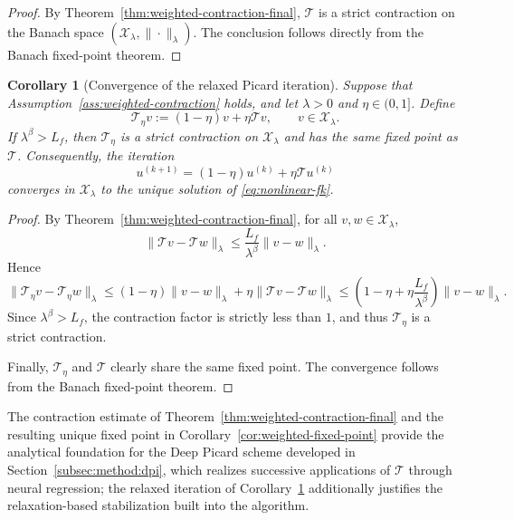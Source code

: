\documentclass[a4paper,fleqn]{cas-sc}
\newtheorem{corollary}{Corollary}
\begin{document}
\begin{proof}
By Theorem~\ref{thm:weighted-contraction-final}, $\mathcal{T}$ is a strict contraction on the Banach space $(\mathcal{X}_\lambda,\|\cdot\|_\lambda)$. The conclusion follows directly from the Banach fixed-point theorem.
\end{proof}

\begin{corollary}[Convergence of the relaxed Picard iteration]
\label{cor:relaxed-picard}
Suppose that Assumption~\ref{ass:weighted-contraction} holds, and let $\lambda>0$ and $\eta\in(0,1]$. Define
\begin{equation}\label{eq:relaxed-operator}
\mathcal{T}_\eta v := (1-\eta)v+\eta\mathcal{T}v,
\qquad v\in\mathcal{X}_\lambda.
\end{equation}
If $\lambda^\beta>L_f$, then $\mathcal{T}_\eta$ is a strict contraction on $\mathcal{X}_\lambda$ and has the same fixed point as $\mathcal{T}$. Consequently, the iteration
\begin{equation}\label{eq:relaxed-picard}
u^{(k+1)}=(1-\eta)u^{(k)}+\eta\mathcal{T}u^{(k)}
\end{equation}
converges in $\mathcal{X}_\lambda$ to the unique solution of \eqref{eq:nonlinear-fk}.
\end{corollary}

\begin{proof}
By Theorem~\ref{thm:weighted-contraction-final}, for all $v,w\in\mathcal{X}_\lambda$,
\[
\|\mathcal{T}v-\mathcal{T}w\|_\lambda
\le
\frac{L_f}{\lambda^\beta}\|v-w\|_\lambda.
\]
Hence
\[
\|\mathcal{T}_\eta v-\mathcal{T}_\eta w\|_\lambda
\le
(1-\eta)\|v-w\|_\lambda
+
\eta\|\mathcal{T}v-\mathcal{T}w\|_\lambda
\le
\left(1-\eta+\eta\frac{L_f}{\lambda^\beta}\right)\|v-w\|_\lambda.
\]
Since $\lambda^\beta>L_f$, the contraction factor is strictly less than $1$, and thus $\mathcal{T}_\eta$ is a strict contraction.

Finally, $\mathcal{T}_\eta$ and $\mathcal{T}$ clearly share the same fixed point. The convergence follows from the Banach fixed-point theorem.
\end{proof}

The contraction estimate of Theorem~\ref{thm:weighted-contraction-final} and
the resulting unique fixed point in Corollary~\ref{cor:weighted-fixed-point}
provide the analytical foundation for the Deep Picard scheme developed in
Section~\ref{subsec:method:dpi}, which realizes successive applications of
$\mathcal{T}$ through neural regression; the relaxed iteration of
Corollary~\ref{cor:relaxed-picard} additionally justifies the
relaxation-based stabilization built into the algorithm.
\end{document}
